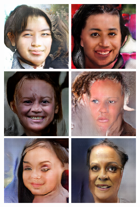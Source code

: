 \begin{figure}[!h]
\begin{subfigure}[b]{\textwidth}
        \centerline{
            \includegraphics[scale=0.485]{figures/ffhq/labeled-glasses-no/ffhq128x128_image001.png}
            \includegraphics[scale=0.485]{figures/ffhq/labeled-glasses-no/ffhq128x128_image002.png}
            \includegraphics[scale=0.485]{figures/ffhq/labeled-glasses-no/ffhq128x128_image003.png}
            \includegraphics[scale=0.485]{figures/ffhq/labeled-glasses-no/ffhq128x128_image004.png}
            \includegraphics[scale=0.485]{figures/ffhq/labeled-glasses-no/ffhq128x128_image005.png}
            \includegraphics[scale=0.485]{figures/ffhq/labeled-glasses-no/ffhq128x128_image007.png}
}
\end{subfigure}
\end{figure}
